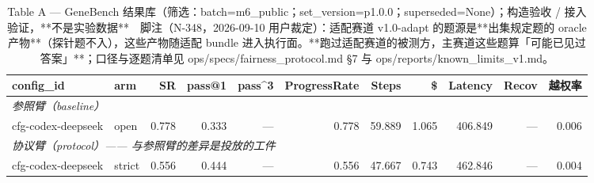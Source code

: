 \begin{table}[t]
\centering
\caption{Table A — GeneBench 结果库（筛选：batch=m6\_public；set\_version=p1.0.0；superseded=None）；构造验收 / 接入验证，**不是实验数据**　脚注（N-348，2026-09-10 用户裁定）：适配赛道 v1.0-adapt 的题源是**出集规定题的 oracle 产物**（探针题不入），这些产物随适配 bundle 进入执行面。**跑过适配赛道的被测方，主赛道这些题算「可能已见过答案」**；口径与逐题清单见 ops/specs/fairness\_protocol.md §7 与 ops/reports/known\_limits\_v1.md。}
\label{tab:a}
\begin{tabular}{llrrrrrrrrr}
\toprule
config\_id & arm & SR & pass@1 & pass\^{}3 & ProgressRate & Steps & \$ & Latency & Recov & 越权率 \\
\midrule
\multicolumn{11}{l}{\textit{参照臂（baseline）}} \\
cfg-codex-deepseek & open & 0.778 & 0.333 & --- & 0.778 & 59.889 & 1.065 & 406.849 & --- & 0.006 \\
\midrule
\multicolumn{11}{l}{\textit{协议臂（protocol）—— 与参照臂的差异是投放的工件}} \\
cfg-codex-deepseek & strict & 0.556 & 0.444 & --- & 0.556 & 47.667 & 0.743 & 462.846 & --- & 0.004 \\
\bottomrule
\end{tabular}
\end{table}

